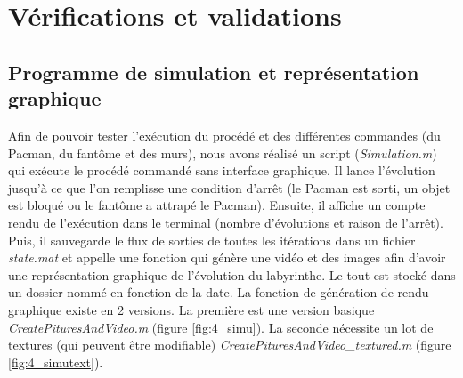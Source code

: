 \chapter{Vérifications et validations}\label{sec:verif}
\section{Programme de simulation et représentation graphique}
Afin de pouvoir tester l'exécution du procédé et des différentes commandes (du Pacman, du fantôme et des murs), nous avons réalisé un script (\emph{Simulation.m}) qui exécute le procédé commandé sans interface graphique. Il lance l'évolution jusqu'à ce que l'on remplisse une condition d'arrêt (le Pacman est sorti, un objet est bloqué ou le fantôme a attrapé le Pacman). Ensuite, il affiche un compte rendu de l'exécution dans le terminal (nombre d'évolutions et raison de l'arrêt). Puis, il sauvegarde le flux de sorties de toutes les itérations dans un fichier \emph{state.mat} et appelle une fonction qui génère une vidéo et des images afin d'avoir une représentation graphique de l'évolution du labyrinthe. Le tout est stocké dans un dossier nommé en fonction de la date. La fonction de génération de rendu graphique existe en 2 versions. La première est une version basique \emph{CreatePituresAndVideo.m} (figure \ref{fig:4_simu}). La seconde nécessite un lot de textures (qui peuvent être modifiable) \emph{CreatePituresAndVideo\_textured.m} (figure \ref{fig:4_simutext}). %

